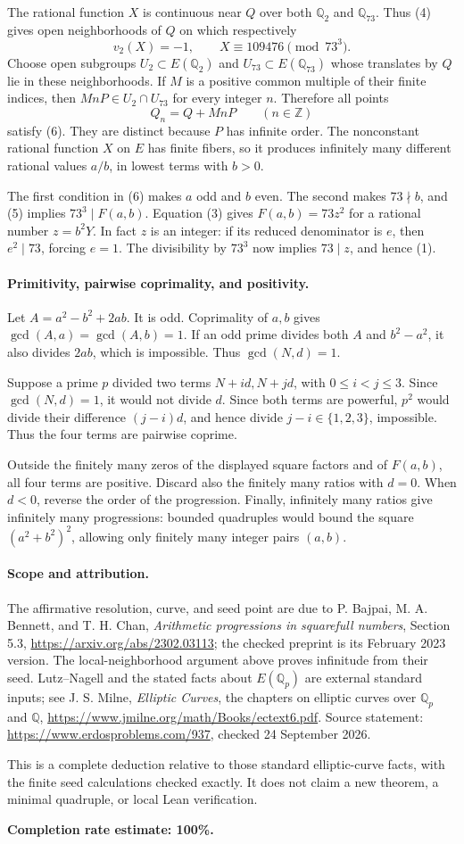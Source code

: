 The rational function \(X\) is continuous near \(Q\) over both \(\mathbb Q_2\) and \(\mathbb Q_{73}\). Thus (4) gives open neighborhoods of \(Q\) on which respectively
\[
 v_2(X)=-1,\qquad X\equiv109476\pmod{73^3}. \tag{6}
\]
Choose open subgroups \(U_2\subset E(\mathbb Q_2)\) and \(U_{73}\subset E(\mathbb Q_{73})\) whose translates by \(Q\) lie in these neighborhoods. If \(M\) is a positive common multiple of their finite indices, then \(MnP\in U_2\cap U_{73}\) for every integer \(n\). Therefore all points
\[
 Q_n=Q+MnP\qquad(n\in\mathbb Z)
\]
satisfy (6). They are distinct because \(P\) has infinite order. The nonconstant rational function \(X\) on \(E\) has finite fibers, so it produces infinitely many different rational values \(a/b\), in lowest terms with \(b>0\).

The first condition in (6) makes \(a\) odd and \(b\) even. The second makes \(73\nmid b\), and (5) implies \(73^3\mid F(a,b)\). Equation (3) gives
\(F(a,b)=73z^2\) for a rational number \(z=b^2Y\). In fact \(z\) is an integer: if its reduced denominator is \(e\), then \(e^2\mid73\), forcing \(e=1\). The divisibility by \(73^3\) now implies \(73\mid z\), and hence (1).

\paragraph{Primitivity, pairwise coprimality, and positivity.}
Let \(A=a^2-b^2+2ab\). It is odd. Coprimality of \(a,b\) gives \(\gcd(A,a)=\gcd(A,b)=1\). If an odd prime divides both \(A\) and \(b^2-a^2\), it also divides \(2ab\), which is impossible. Thus \(\gcd(N,d)=1\).

Suppose a prime \(p\) divided two terms \(N+id,N+jd\), with \(0\leq i<j\leq3\). Since \(\gcd(N,d)=1\), it would not divide \(d\). Since both terms are powerful, \(p^2\) would divide their difference \((j-i)d\), and hence divide \(j-i\in\{1,2,3\}\), impossible. Thus the four terms are pairwise coprime.

Outside the finitely many zeros of the displayed square factors and of \(F(a,b)\), all four terms are positive. Discard also the finitely many ratios with \(d=0\). When \(d<0\), reverse the order of the progression. Finally, infinitely many ratios give infinitely many progressions: bounded quadruples would bound the square \((a^2+b^2)^2\), allowing only finitely many integer pairs \((a,b)\).

\paragraph{Scope and attribution.}
The affirmative resolution, curve, and seed point are due to P. Bajpai, M. A. Bennett, and T. H. Chan, \emph{Arithmetic progressions in squarefull numbers}, Section 5.3, \url{https://arxiv.org/abs/2302.03113}; the checked preprint is its February 2023 version. The local-neighborhood argument above proves infinitude from their seed. Lutz--Nagell and the stated facts about \(E(\mathbb Q_p)\) are external standard inputs; see J. S. Milne, \emph{Elliptic Curves}, the chapters on elliptic curves over \(\mathbb Q_p\) and \(\mathbb Q\), \url{https://www.jmilne.org/math/Books/ectext6.pdf}. Source statement: \url{https://www.erdosproblems.com/937}, checked 24 September 2026.

This is a complete deduction relative to those standard elliptic-curve facts, with the finite seed calculations checked exactly. It does not claim a new theorem, a minimal quadruple, or local Lean verification.

\textbf{Completion rate estimate: 100\%.}
